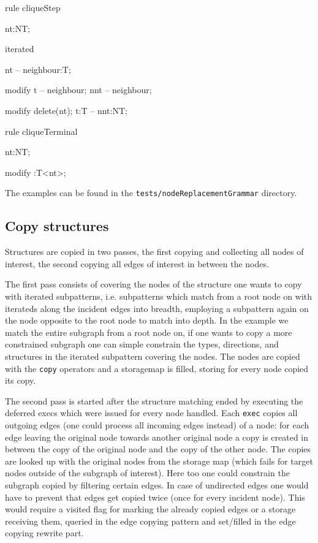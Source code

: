   \begin{example}
    \begin{grgen}
rule cliqueStep
{
  nt:NT;

  iterated {
    nt -- neighbour:T;

    modify {
      t -- neighbour;
      nnt -- neighbour;
    }
  }

  modify {
    delete(nt);
    t:T -- nnt:NT;
  }
}

rule cliqueTerminal
{
  nt:NT;

  modify {
    :T<nt>;
  }
}
    \end{grgen}
  \end{example}

The examples can be found in the \texttt{tests/nodeReplacementGrammar} directory.


\subsection{Copy structures}\label{subsub:copystructure}
Structures are copied in two passes, the first copying and collecting all nodes of interest, the second copying all edges of interest in between the nodes.

The first pass consists of covering the nodes of the structure one wants to copy with iterated subpatterns,
i.e. subpatterns which match from a root node on with iterateds along the incident edges into breadth,
employing a subpattern again on the node opposite to the root node to match into depth.
In the example we match the entire subgraph from a root node on, if one wants to copy a more constrained subgraph one can simple constrain the types, directions, and structures in the iterated subpattern covering the nodes.
The nodes are copied with the \texttt{copy} operators and a storagemap is filled, storing for every node copied its copy.

The second pass is started after the structure matching ended by executing the deferred execs which were issued for every node handled.
Each \texttt{exec} copies all outgoing edges (one could process all incoming edges instead) of a node:
for each edge leaving the original node towards another original node a copy is created in between the copy of the original node and the copy of the other node.
The copies are looked up with the original nodes from the storage map (which fails for target nodes outside of the subgraph of interest).
Here too one could constrain the subgraph copied by filtering certain edges.
In case of undirected edges one would have to prevent that edges get copied twice (once for every incident node). This would require a visited flag for marking the already copied edges or a storage receiving them, queried in the edge copying pattern and set/filled in the edge copying rewrite part.

